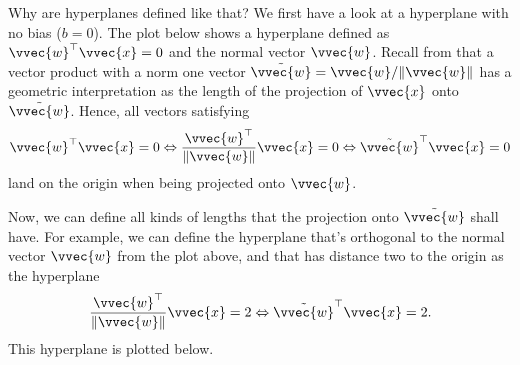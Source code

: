 \documentclass[letterpaper,10pt,english]{jupyterBook}
\begin{document}
\sphinxAtStartPar
Why are hyperplanes defined like that? We first have a look at a hyperplane with no bias (\(b=0\)). The plot below shows a hyperplane defined as \(\vvec{w}^\top \vvec{x}=0\) and the normal vector \(\vvec{w}\). Recall from  that a vector product with a norm one vector \(\tilde{\vvec{w}}=\vvec{w}/\lVert \vvec{w}\rVert\) has a geometric interpretation as the length of the projection of \(\vvec{x}\) onto \(\tilde{\vvec{w}}\). Hence, all vectors satisfying
\begin{equation*}
\begin{split}\vvec{w}^\top\vvec{x}=0\Leftrightarrow \frac{\vvec{w}^\top}{\lVert \vvec{w}\rVert}\vvec{x}=0\Leftrightarrow \tilde{\vvec{w}}^\top\vvec{x}=0\end{split}
\end{equation*}
land on the origin when being projected onto \(\vvec{w}\).
\begin{center}\end{center}
\sphinxAtStartPar
Now, we can define all kinds of lengths that the projection onto \(\tilde{\vvec{w}}\) shall have. For example, we can define the hyperplane that’s orthogonal to the normal vector \(\vvec{w}\) from the plot above, and that has distance two to the origin as the hyperplane
\begin{equation*}
\begin{split}\frac{\vvec{w}^\top}{\lVert\vvec{w}\rVert} \vvec{x}=2\Leftrightarrow \tilde{\vvec{w}}^\top\vvec{x}=2.\end{split}
\end{equation*}
This hyperplane is plotted below.
\end{document}
